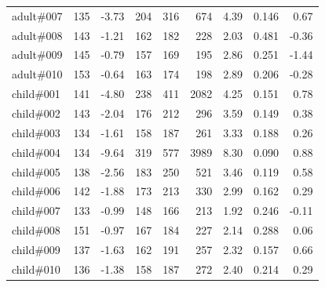 \begin{table}[H]
\begin{tabular}{lrrrrrrrr}
adult\#007 & 135 & -3.73 & 204 & 316 & 674 & 4.39 & 0.146 & 0.67 \\
adult\#008 & 143 & -1.21 & 162 & 182 & 228 & 2.03 & 0.481 & -0.36 \\
adult\#009 & 145 & -0.79 & 157 & 169 & 195 & 2.86 & 0.251 & -1.44 \\
adult\#010 & 153 & -0.64 & 163 & 174 & 198 & 2.89 & 0.206 & -0.28 \\
child\#001 & 141 & -4.80 & 238 & 411 & 2082 & 4.25 & 0.151 & 0.78 \\
child\#002 & 143 & -2.04 & 176 & 212 & 296 & 3.59 & 0.149 & 0.38 \\
child\#003 & 134 & -1.61 & 158 & 187 & 261 & 3.33 & 0.188 & 0.26 \\
child\#004 & 134 & -9.64 & 319 & 577 & 3989 & 8.30 & 0.090 & 0.88 \\
child\#005 & 138 & -2.56 & 183 & 250 & 521 & 3.46 & 0.119 & 0.58 \\
child\#006 & 142 & -1.88 & 173 & 213 & 330 & 2.99 & 0.162 & 0.29 \\
child\#007 & 133 & -0.99 & 148 & 166 & 213 & 1.92 & 0.246 & -0.11 \\
child\#008 & 151 & -0.97 & 167 & 184 & 227 & 2.14 & 0.288 & 0.06 \\
child\#009 & 137 & -1.63 & 162 & 191 & 257 & 2.32 & 0.157 & 0.66 \\
child\#010 & 136 & -1.38 & 158 & 187 & 272 & 2.40 & 0.214 & 0.29 \\
\bottomrule
\end{tabular}
\end{table}

